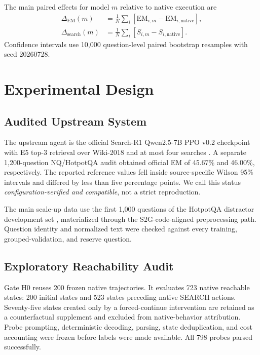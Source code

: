 \documentclass[11pt,a4paper]{article}
\begin{document}
The main paired effects for model $m$ relative to native execution are
\begin{align}
  \Delta_{\mathrm{EM}}(m)&=\frac{1}{N}\sum_i\left[\mathrm{EM}_{i,m}-\mathrm{EM}_{i,\mathrm{native}}\right],\\
  \Delta_{\mathrm{search}}(m)&=\frac{1}{N}\sum_i\left[S_{i,m}-S_{i,\mathrm{native}}\right].
\end{align}
Confidence intervals use 10,000 question-level paired bootstrap resamples with seed 20260728.

\section{Experimental Design}

\subsection{Audited Upstream System}

The upstream agent is the official Search-R1 Qwen2.5-7B PPO v0.2 checkpoint with E5 top-3 retrieval over Wiki-2018 and at most four searches \citep{jin2025searchr1}. A separate 1,200-question NQ/HotpotQA audit obtained official EM of 45.67\% and 46.00\%, respectively. The reported reference values fell inside source-specific Wilson 95\% intervals and differed by less than five percentage points. We call this status \emph{configuration-verified and compatible}, not a strict reproduction.

The main scale-up data use the first 1,000 questions of the HotpotQA distractor development set \citep{yang2018hotpotqa}, materialized through the S2G-code-aligned preprocessing path. Question identity and normalized text were checked against every training, grouped-validation, and reserve question.

\subsection{Exploratory Reachability Audit}

Gate H0 reuses 200 frozen native trajectories. It evaluates 723 native reachable states: 200 initial states and 523 states preceding native SEARCH actions. Seventy-five states created only by a forced-continue intervention are retained as a counterfactual supplement and excluded from native-behavior attribution. Probe prompting, deterministic decoding, parsing, state deduplication, and cost accounting were frozen before labels were made available. All 798 probes parsed successfully.
\end{document}
